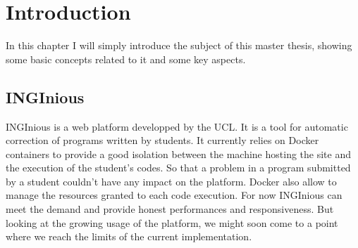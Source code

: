\chapter{Introduction}

In this chapter I will simply introduce the subject of this master thesis, showing some basic concepts related to it and some key aspects.

\section{INGInious}

INGInious is a web platform developped by the UCL.  It is a tool for automatic correction of programs written by students.  It currently relies on Docker containers to provide a good isolation between the machine hosting the site and the execution of the student's codes.  So that a problem in a program submitted by a student couldn't have any impact on the platform.  Docker also allow to manage the resources granted to each code execution.  For now INGInious can meet the demand and provide honest performances and responsiveness.  But looking at the growing usage of the platform, we might soon come to a point where we reach the limits of the current implementation.

